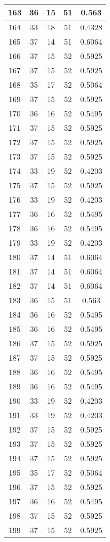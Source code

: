 \documentclass[letterpaper, 12pt]{article}
\begin{document}
\begin{longtable}{|c|c|c|c|c|}
\hline
163 & 36 & 15 & 51 & 0.563 \\
\hline
164 & 33 & 18 & 51 & 0.4328 \\
\hline
165 & 37 & 14 & 51 & 0.6064 \\
\hline
166 & 37 & 15 & 52 & 0.5925 \\
\hline
167 & 37 & 15 & 52 & 0.5925 \\
\hline
168 & 35 & 17 & 52 & 0.5064 \\
\hline
169 & 37 & 15 & 52 & 0.5925 \\
\hline
170 & 36 & 16 & 52 & 0.5495 \\
\hline
171 & 37 & 15 & 52 & 0.5925 \\
\hline
172 & 37 & 15 & 52 & 0.5925 \\
\hline
173 & 37 & 15 & 52 & 0.5925 \\
\hline
174 & 33 & 19 & 52 & 0.4203 \\
\hline
175 & 37 & 15 & 52 & 0.5925 \\
\hline
176 & 33 & 19 & 52 & 0.4203 \\
\hline
177 & 36 & 16 & 52 & 0.5495 \\
\hline
178 & 36 & 16 & 52 & 0.5495 \\
\hline
179 & 33 & 19 & 52 & 0.4203 \\
\hline
180 & 37 & 14 & 51 & 0.6064 \\
\hline
181 & 37 & 14 & 51 & 0.6064 \\
\hline
182 & 37 & 14 & 51 & 0.6064 \\
\hline
183 & 36 & 15 & 51 & 0.563 \\
\hline
184 & 36 & 16 & 52 & 0.5495 \\
\hline
185 & 36 & 16 & 52 & 0.5495 \\
\hline
186 & 37 & 15 & 52 & 0.5925 \\
\hline
187 & 37 & 15 & 52 & 0.5925 \\
\hline
188 & 36 & 16 & 52 & 0.5495 \\
\hline
189 & 36 & 16 & 52 & 0.5495 \\
\hline
190 & 33 & 19 & 52 & 0.4203 \\
\hline
191 & 33 & 19 & 52 & 0.4203 \\
\hline
192 & 37 & 15 & 52 & 0.5925 \\
\hline
193 & 37 & 15 & 52 & 0.5925 \\
\hline
194 & 37 & 15 & 52 & 0.5925 \\
\hline
195 & 35 & 17 & 52 & 0.5064 \\
\hline
196 & 37 & 15 & 52 & 0.5925 \\
\hline
197 & 36 & 16 & 52 & 0.5495 \\
\hline
198 & 37 & 15 & 52 & 0.5925 \\
\hline
199 & 37 & 15 & 52 & 0.5925 \\
\hline
\end{longtable}
\end{document}
